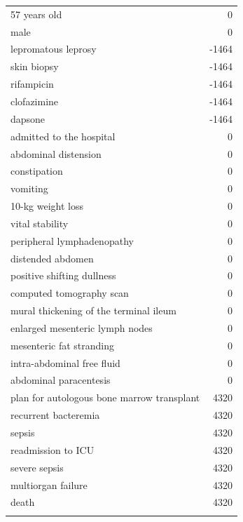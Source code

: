 \begin{figure}[t]
\begin{minipage}[!htbp]{0.49\textwidth}
        \footnotesize
        \begin{tabular}{P{0.75\textwidth}r}
            57 years old & 0 \\
            male & 0 \\
            lepromatous leprosy & -1464 \\
            skin biopsy & -1464 \\
            rifampicin & -1464 \\
            clofazimine & -1464 \\
            dapsone & -1464 \\
            admitted to the hospital & 0 \\
            abdominal distension & 0 \\
            constipation & 0 \\
            vomiting & 0 \\
            10-kg weight loss & 0 \\
            vital stability & 0 \\
            peripheral lymphadenopathy & 0 \\
            distended abdomen & 0 \\
            positive shifting dullness & 0 \\
            computed tomography scan & 0 \\
            mural thickening of the terminal ileum & 0 \\
            enlarged mesenteric lymph nodes & 0 \\
            mesenteric fat stranding & 0 \\
            intra-abdominal free fluid & 0 \\
            abdominal paracentesis & 0 \\
            plan for autologous bone marrow transplant & 4320 \\
            recurrent bacteremia & 4320 \\
            sepsis & 4320 \\
            readmission to ICU & 4320 \\
            severe sepsis & 4320 \\
            multiorgan failure & 4320 \\
            death & 4320 \\
            & 
        \end{tabular}
    \end{minipage}

\end{figure}


